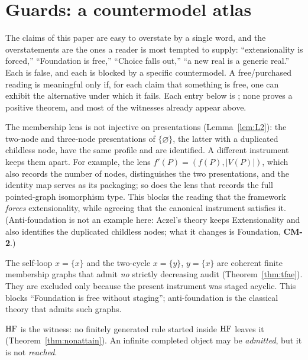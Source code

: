 \section{Guards: a countermodel atlas}\label{sec:atlas}

The claims of this paper are easy to overstate by a single word, and the overstatements are the
ones a reader is most tempted to supply: ``extensionality is forced,'' ``Foundation is free,''
``Choice falls out,'' ``a new real is a generic real.'' Each is false, and each is blocked by a
specific countermodel. A free/purchased reading is meaningful only if, for each claim that
something is free, one can exhibit the alternative under which it fails. Each entry below is
\guardg{}; none proves a positive theorem, and most of the witnesses already appear above.

\begin{description}[leftmargin=1.2em, itemsep=4pt]

\item[\textbf{CM-1}: Extensionality is a choice of lens.] The membership lens is not injective on
presentations (Lemma~\ref{lem:L2}): the two-node and three-node presentations of
$\{\varnothing\}$, the latter with a duplicated childless node, have the same profile and are
identified. A different instrument keeps them apart. For example, the lens $f'(P)=(f(P),|V(P)|)$,
which also records the number of nodes, distinguishes the two presentations, and the identity map
serves as its packaging; so does the lens that records the full pointed-graph isomorphism type.
This blocks the reading that the framework \emph{forces} extensionality, while agreeing that the
canonical instrument satisfies it. (Anti-foundation is not an example here: Aczel's theory keeps
Extensionality and also identifies the duplicated childless nodes; what it changes is Foundation,
\textbf{CM-2}.)

\item[\textbf{CM-2}: Foundation needs staging.] The self-loop $x=\{x\}$ and the two-cycle
$x=\{y\}$, $y=\{x\}$ are coherent finite membership graphs that admit \emph{no} strictly
decreasing audit (Theorem~\ref{thm:tfae}). They are excluded only because the present instrument
was staged acyclic. This blocks ``Foundation is free without staging''; anti-foundation
\citep{Aczel1988} is the classical theory that admits such graphs.

\item[\textbf{CM-3}: Infinity does not emerge from iteration.] $\mathrm{HF}$ is the witness: no finitely
generated rule started inside $\mathrm{HF}$ leaves it (Theorem~\ref{thm:nonattain}). An infinite completed
object may be \emph{admitted}, but it is not \emph{reached}.


\end{description}
